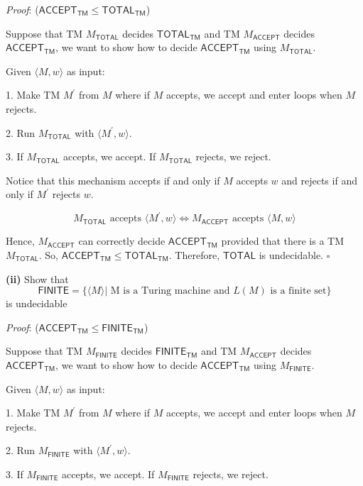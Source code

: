 \documentclass[a4paper, 11pt]{article}
\renewcommand{\part}[1] {\vspace{.10in} {\bf (#1)}}
\begin{document}
	{\em Proof}:  ($\textsf{ACCEPT}_{\textsf{TM}} \leq \textsf{TOTAL}_{\textsf{TM}} $)
	
	Suppose that TM $M_{\textsf{TOTAL}}$ decides $\textsf{TOTAL}_{\textsf{TM}}$ and TM $M_{\textsf{ACCEPT}}$ decides $\textsf{ACCEPT}_{\textsf{TM}}$, we want to show how to decide $\textsf{ACCEPT}_{\textsf{TM}}$ using $M_{\textsf{TOTAL}}$.
	
	Given $\langle M, w \rangle$ as input:
	
	1. Make TM $M^\prime$ from $M$ where if $M$ accepts, we accept and enter loops when $M$ rejects.
	
	2. Run $M_{\textsf{TOTAL}}$ with $\langle M^\prime, w \rangle$.
	
	3. If $M_{\textsf{TOTAL}}$ accepts, we accept. If $M_{\textsf{TOTAL}}$ rejects, we reject.
	
	Notice that this mechanism accepts if and only if $M$ accepts $w$ and rejects if and only if $M^\prime$ rejects $w$. 
	
	$$ M_{\textsf{TOTAL}} \text{ accepts }\langle M^\prime,w \rangle \iff M_{\textsf{ACCEPT}} \text{ accepts } \langle M,w\rangle $$
	
	Hence, $M_{\textsf{ACCEPT}}$ can correctly decide $\textsf{ACCEPT}_{\textsf{TM}}$ provided that there is a TM $M_{\textsf{TOTAL}}$. So, $\textsf{ACCEPT}_{\textsf{TM}} \leq \textsf{TOTAL}_{\textsf{TM}} $. Therefore, $\textsf{TOTAL}$ is undecidable. $\square$

	
	\part{ii} Show that 
	$$ \textsf{FINITE} = \{\langle M \rangle | \text{ M is a Turing machine and $L(M)$ is a finite set} \} $$ is undecidable

	{\em Proof}: ($\textsf{ACCEPT}_{\textsf{TM}} \leq \textsf{FINITE}_{\textsf{TM}} $)
	
	Suppose that TM $M_{\textsf{FINITE}}$ decides $\textsf{FINITE}_{\textsf{TM}}$ and TM $M_{\textsf{ACCEPT}}$ decides $\textsf{ACCEPT}_{\textsf{TM}}$, we want to show how to decide $\textsf{ACCEPT}_{\textsf{TM}}$ using $M_{\textsf{FINITE}}$.
	
	Given $\langle M, w \rangle$ as input:
	
	1. Make TM $M^\prime$ from $M$ where if $M$ accepts, we accept and enter loops when $M$ rejects.
	
	2. Run $M_{\textsf{FINITE}}$ with $\langle M^\prime, w \rangle$.
	
	3. If $M_{\textsf{FINITE}}$ accepts, we accept. If $M_{\textsf{FINITE}}$ rejects, we reject.
	
\end{document}
